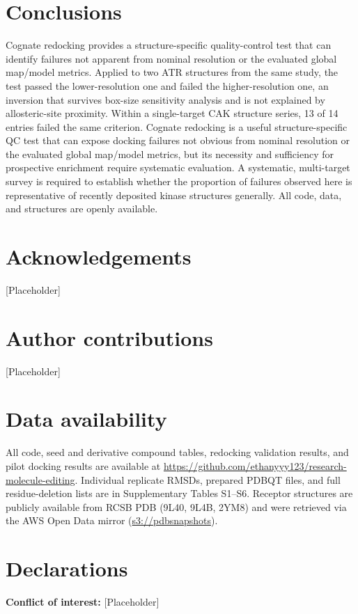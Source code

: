\documentclass[global,twocolumn]{svjour}
\begin{document}
\section{Conclusions}

Cognate redocking provides a structure-specific quality-control test that can
identify failures not apparent from nominal resolution or the evaluated global
map/model metrics. Applied to two ATR structures from the same study, the test
passed the lower-resolution one and failed the higher-resolution one, an
inversion that survives box-size sensitivity analysis and is not explained by
allosteric-site proximity. Within a single-target CAK structure series, 13
of 14 entries failed the same criterion. Cognate redocking is a useful
structure-specific QC test that can expose docking failures not obvious from
nominal resolution or the evaluated global map/model metrics, but its
necessity and sufficiency for prospective enrichment require systematic
evaluation. A systematic, multi-target survey is required to establish whether
the proportion of failures observed here is representative of recently
deposited kinase structures generally. All code, data, and structures are
openly available.

\section*{Acknowledgements}
[Placeholder]

\section*{Author contributions}
[Placeholder]

\section*{Data availability}
All code, seed and derivative compound tables, redocking validation results, and
pilot docking results are available at
\url{https://github.com/ethanyyy123/research-molecule-editing}. Individual
replicate RMSDs, prepared PDBQT files, and full residue-deletion lists are in
Supplementary Tables S1--S6. Receptor structures are publicly available from
RCSB PDB (9L40, 9L4B, 2YM8) and were retrieved via the AWS Open Data mirror
(\url{s3://pdbsnapshots}).

\section*{Declarations}
\textbf{Conflict of interest:} [Placeholder]



\end{document}
